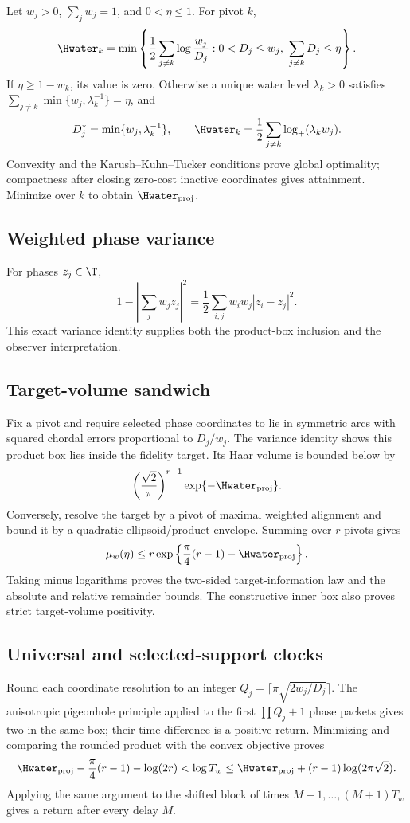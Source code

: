 Let $w_j>0$, $\sum_jw_j=1$, and $0<\eta\le1$.  For pivot $k$,
\[
 \Hwater_k=\min\left\{\frac12\sum_{j\ne k}\log\frac{w_j}{D_j}:
 0<D_j\le w_j,\ \sum_{j\ne k}D_j\le\eta\right\}.
\]
If $\eta\ge1-w_k$, its value is zero.  Otherwise a unique water level
$\lambda_k>0$ satisfies
$\sum_{j\ne k}\min\{w_j,\lambda_k^{-1}\}=\eta$, and
\[
 D_j^*=\min\{w_j,\lambda_k^{-1}\},\qquad
 \Hwater_k=\frac12\sum_{j\ne k}\log_+(\lambda_kw_j).
\]
Convexity and the Karush--Kuhn--Tucker conditions prove global optimality;
compactness after closing zero-cost inactive coordinates gives attainment.
Minimize over $k$ to obtain $\Hwater_{\rm proj}$.

\subsection{Weighted phase variance}

For phases $z_j\in\T$,
\[
 1-\left|\sum_jw_jz_j\right|^2
 =\frac12\sum_{i,j}w_iw_j|z_i-z_j|^2.
\]
This exact variance identity supplies both the product-box inclusion and the
observer interpretation.

\subsection{Target-volume sandwich}

Fix a pivot and require selected phase coordinates to lie in symmetric arcs
with squared chordal errors proportional to $D_j/w_j$.  The variance
identity shows this product box lies inside the fidelity target.  Its Haar
volume is bounded below by
\[
 \left(\frac{\sqrt2}{\pi}\right)^{r-1}
 \exp\{-\Hwater_{\rm proj}\}.
\]
Conversely, resolve the target by a pivot of maximal weighted alignment and
bound it by a quadratic ellipsoid/product envelope.  Summing over $r$
pivots gives
\[
 \mu_w(\eta)\le
 r\exp\left\{\frac\pi4(r-1)-\Hwater_{\rm proj}\right\}.
\]
Taking minus logarithms proves the two-sided target-information law and the
absolute and relative remainder bounds.  The constructive inner box also
proves strict target-volume positivity.

\subsection{Universal and selected-support clocks}

Round each coordinate resolution to an integer
$Q_j=\lceil\pi\sqrt{2w_j/D_j}\rceil$.  The anisotropic pigeonhole principle
applied to the first $\prod Q_j+1$ phase packets gives two in the same box;
their time difference is a positive return.  Minimizing and comparing the
rounded product with the convex objective proves
\[
 \Hwater_{\rm proj}-\frac\pi4(r-1)-\log(2r)
 <\log T_w
 \le\Hwater_{\rm proj}+(r-1)\log(2\pi\sqrt2).
\]
Applying the same argument to the shifted block of times
$M+1,\ldots,(M+1)T_w$ gives a return after every delay $M$.

